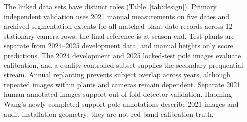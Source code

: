 \documentclass[12pt,letterpaper]{article}
\begin{document}
The linked data sets have distinct roles (Table~\ref{tab:design}). Primary independent validation uses 2021 manual measurements on five dates and archived segmentation extents for all matched plant-date records across 12 stationary-camera rows; the final reference is at season end. Test plants are separate from 2024--2025 development data, and manual heights only score predictions. The 2024 development and 2025 locked-test pole images evaluate calibration, and a quality-controlled subset supplies the secondary prequential stream. Annual replanting prevents subject overlap across years, although repeated images within plants and cameras remain dependent. Separate 2021 human-annotated images support out-of-fold detector validation. Haoming Wang's newly completed support-pole annotations describe 2021 images and audit installation geometry; they are not red-band calibration truth.
\end{document}
